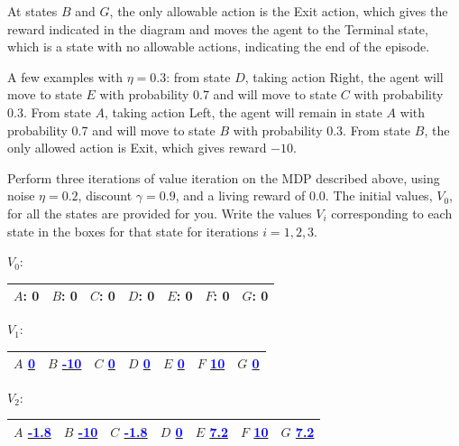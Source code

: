 \documentclass[12pt]{article}
\newenvironment{qparts}{\begin{enumerate}[{(}a{)}]}{\end{enumerate}}
\begin{document}
\begin{qparts}
  At states $B$ and $G$, the only allowable action is the Exit action, which gives the reward indicated in the diagram and moves the agent to the Terminal state, which is a state with no allowable actions, indicating the end of the episode.

  A few examples with $\eta=0.3$: from state $D$, taking action Right, the agent will move to state $E$ with probability 0.7 and will move to state $C$ with probability 0.3. From state $A$, taking action Left, the agent will remain in state $A$ with probability 0.7 and will move to state $B$ with probability 0.3. From state $B$, the only allowed action is Exit, which gives reward $-10$.

  Perform three iterations of value iteration on the MDP described above, using noise $\eta=0.2$, discount $\gamma=0.9$, and a living reward of 0.0. The initial values, $V_0$, for all the states are provided for you. Write the values $V_i$ corresponding to each state in the boxes for that state for iterations $i=1, 2, 3$.

  $V_0$:

  \bgroup
  \def\arraystretch{3}
  \begin{tabular}{|p{1.5cm}|p{1.5cm}|p{1.5cm}|p{1.5cm}|p{1.5cm}|p{1.5cm}|p{1.5cm}|}
    \hline
    $A$: 0 & $B$: 0 & $C$: 0 & $D$: 0 & $E$: 0 & $F$: 0 & $G$: 0 \\ \hline
  \end{tabular}
  \egroup

  $V_1$:

  \bgroup
  \def\arraystretch{3}
  \centering
  \begin{tabular}{|p{1.5cm}|p{1.5cm}|p{1.5cm}|p{1.5cm}|p{1.5cm}|p{1.5cm}|p{1.5cm}|}
    \hline
    $A$ \underline{\textcolor{blue}{0}} & $B$ \underline{\textcolor{blue}{-10}} & $C$ \underline{\textcolor{blue}{0}} & $D$ \underline{\textcolor{blue}{0}} & $E$ \underline{\textcolor{blue}{0}} & $F$ \underline{\textcolor{blue}{10}} & $G$ \underline{\textcolor{blue}{0}} \\ \hline
  \end{tabular}
  \egroup

  $V_2$:

  \bgroup
  \def\arraystretch{3}
  \centering
  \begin{tabular}{|p{1.5cm}|p{1.5cm}|p{1.5cm}|p{1.5cm}|p{1.5cm}|p{1.5cm}|p{1.5cm}|}
    \hline
    $A$ \underline{\textcolor{blue}{-1.8}} & $B$ \underline{\textcolor{blue}{-10}} & $C$ \underline{\textcolor{blue}{-1.8}} & $D$ \underline{\textcolor{blue}{0}} & $E$ \underline{\textcolor{blue}{7.2}} & $F$ \underline{\textcolor{blue}{10}} & $G$ \underline{\textcolor{blue}{7.2}} \\ \hline
  \end{tabular}
  \egroup


\end{qparts}
\end{document}
